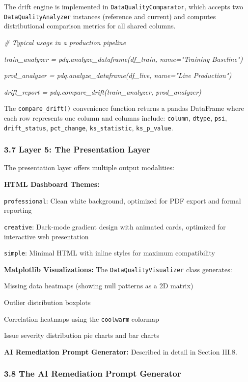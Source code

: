 \documentclass{article}
\begin{document}
The drift engine is implemented in \texttt{DataQualityComparator}, which
accepts two \texttt{DataQualityAnalyzer} instances (reference and
current) and computes distributional comparison metrics for all shared
columns.

\emph{\# Typical usage in a production pipeline}

\emph{train\_analyzer = pdq.analyze\_dataframe(df\_train, name="Training
Baseline")}

\emph{prod\_analyzer = pdq.analyze\_dataframe(df\_live, name="Live
Production")}

\emph{drift\_report = pdq.compare\_drift(train\_analyzer,
prod\_analyzer)}

The \texttt{compare\_drift()} convenience function returns a pandas
DataFrame where each row represents one column and columns include:
\texttt{column}, \texttt{dtype}, \texttt{psi}, \texttt{drift\_status},
\texttt{pct\_change}, \texttt{ks\_statistic}, \texttt{ks\_p\_value}.

\subsubsection{3.7 Layer 5: The Presentation
Layer}\label{layer-5-the-presentation-layer}

The presentation layer offers multiple output modalities:

\textbf{HTML Dashboard Themes:}

\texttt{professional}: Clean white background, optimized for PDF export
and formal reporting

\texttt{creative}: Dark-mode gradient design with animated cards,
optimized for interactive web presentation

\texttt{simple}: Minimal HTML with inline styles for maximum
compatibility

\textbf{Matplotlib Visualizations:} The \texttt{DataQualityVisualizer}
class generates:

Missing data heatmaps (showing null patterns as a 2D matrix)

Outlier distribution boxplots

Correlation heatmaps using the \texttt{coolwarm} colormap

Issue severity distribution pie charts and bar charts

\textbf{AI Remediation Prompt Generator:} Described in detail in Section
III.8.

\subsubsection{3.8 The AI Remediation Prompt
Generator}\label{the-ai-remediation-prompt-generator}
\end{document}
